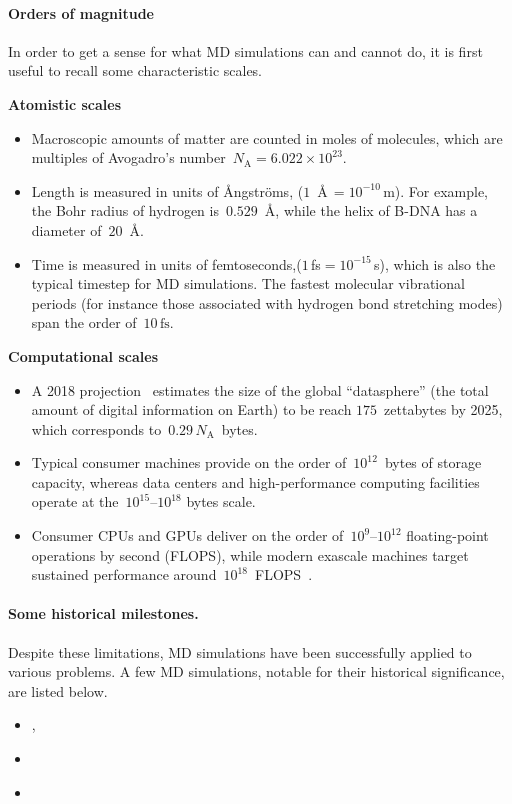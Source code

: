 \paragraph{Orders of magnitude}
In order to get a sense for what MD simulations can and cannot do, it is first useful to recall some characteristic scales.

\noindent
\begin{minipage}[t]{0.48\textwidth}
\textbf{Atomistic scales}
\begin{itemize}
    \item Macroscopic amounts of matter are counted in moles of molecules, which are multiples of Avogadro's number~$N_{\mathrm{A}}=6.022\times 10^{23}$.
    \item Length is measured in units of {\AA ngstr\"oms}, ($1$~\AA$\,=10^{-10}\,\mathrm{m}$). For example, the Bohr radius of hydrogen is~$0.529$~\AA, while the helix of B-DNA has a diameter of~$20$~\AA.
    \item Time is measured in units of femtoseconds,($1$\,fs$=10^{-15}$\,s), which is also the typical timestep for MD simulations. The fastest molecular vibrational periods (for instance those associated with hydrogen bond stretching modes) span the order of~$10\,\mathrm{fs}$.
\end{itemize}
\end{minipage}\hfill
\begin{minipage}[t]{0.48\textwidth}
\textbf{Computational scales}
\begin{itemize}
  \item A 2018 projection~\cite{RGR18} estimates the size of the global ``datasphere'' (the total amount of digital information on Earth) to be reach $175$~zettabytes by 2025, which corresponds to~$0.29\,N_{\mathrm{A}}$~bytes.
  \item Typical consumer machines provide on the order of~$10^{12}$~bytes of storage capacity, whereas data centers and high-performance computing facilities operate at the~$10^{15}$--$10^{18}$ bytes scale.
  \item Consumer CPUs and GPUs deliver on the order of~$10^{9}$--$10^{12}$ floating-point operations by second (FLOPS), while modern exascale machines target sustained performance around~$10^{18}$~FLOPS~\cite{Sc22}.
\end{itemize}
\end{minipage}


\paragraph{Some historical milestones.}
Despite these limitations, MD simulations have been successfully applied to various problems. A few MD simulations, notable for their historical significance, are listed below.
\begin{itemize}
    \item{\cite{MRTT53}, \cite{AWal57}}
    \item{\cite{R64}}
    \item{\cite{LW75}}
\end{itemize}

